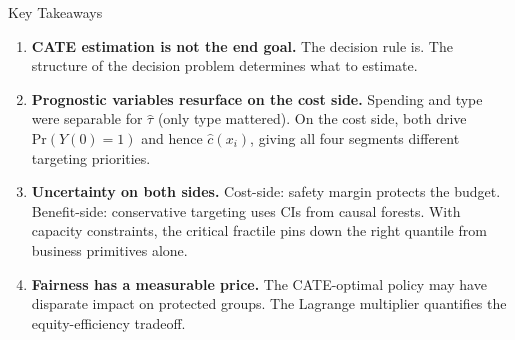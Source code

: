 \documentclass[aspectratio=169, 11pt, handout]{beamer}
\newcommand{\Prob}{\mathrm{Pr}}
\begin{document}
 
\begin{frame}{Key Takeaways}
 
\begin{enumerate}
    \item \textbf{CATE estimation is not the end goal.} The decision rule is. The structure of the decision problem determines what to estimate.
 
    \pause
    \smallskip
 
    \item \textbf{Prognostic variables resurface on the cost side.} Spending and type were separable for $\hat{\tau}$ (only type mattered). On the cost side, both drive $\Prob(Y(0)\!=\!1)$ and hence $\hat{c}(x_i)$, giving all four segments different targeting priorities.
 
    \pause
    \smallskip
 
    \item \textbf{Uncertainty on both sides.} Cost-side: safety margin protects the budget. Benefit-side: conservative targeting uses CIs from causal forests. With capacity constraints, the critical fractile pins down the right quantile from business primitives alone.
 
    \pause
    \smallskip
 
    \item \textbf{Fairness has a measurable price.} The CATE-optimal policy may have disparate impact on protected groups. The Lagrange multiplier quantifies the equity-efficiency tradeoff.
\end{enumerate}
 
\end{frame}
 
\end{document}
